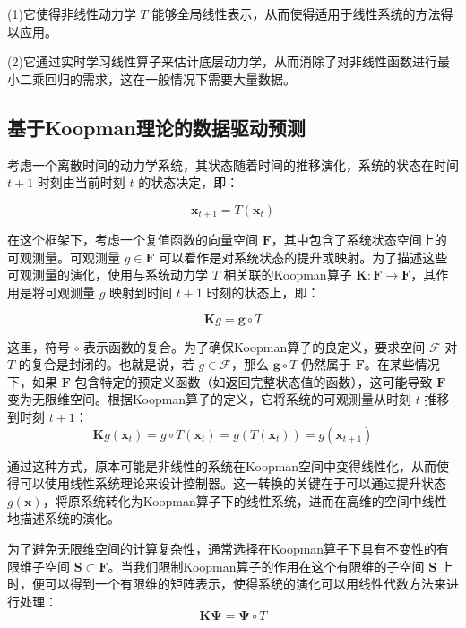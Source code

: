 \documentclass[lang=chs, degree=master, blindreview=false, winfonts=true]{yanputhesis}
\begin{document}
(1)它使得非线性动力学 \( T \) 能够全局线性表示，从而使得适用于线性系统的方法得以应用。

(2)它通过实时学习线性算子来估计底层动力学，从而消除了对非线性函数进行最小二乘回归的需求，这在一般情况下需要大量数据。


\subsection{基于Koopman理论的数据驱动预测}

考虑一个离散时间的动力学系统，其状态随着时间的推移演化，系统的状态在时间 \( t+1 \) 时刻由当前时刻 \( t \) 的状态决定，即：

\begin{equation}
    {\bm x}_{t+1} = T({\bm x}_t)
\end{equation}

在这个框架下，考虑一个复值函数的向量空间 \( \mathcal{\bm F} \)，其中包含了系统状态空间上的可观测量。可观测量 \( g \in \mathcal{\bm F} \) 可以看作是对系统状态的提升或映射。为了描述这些可观测量的演化，使用与系统动力学 \( T \) 相关联的Koopman算子 \( \mathcal{\bm K}: \mathcal{\bm F} \to \mathcal{\bm F} \)，其作用是将可观测量 \( g \) 映射到时间 \( t+1 \) 时刻的状态上，即：

\begin{equation}
    \mathcal{\bm K} g = \bm g \circ T
\end{equation}

这里，符号 \( \circ \) 表示函数的复合。为了确保Koopman算子的良定义，要求空间 \( \mathcal{F} \) 对 \( T \) 的复合是封闭的。也就是说，若 \(  g \in \mathcal{F} \)，那么 \( \bm g \circ T \) 仍然属于 \( \mathcal{\bm F} \)。在某些情况下，如果 \( \mathcal{\bm F} \) 包含特定的预定义函数（如返回完整状态值的函数），这可能导致 \( \mathcal{\bm F} \) 变为无限维空间。根据Koopman算子的定义，它将系统的可观测量从时刻 \( t \) 推移到时刻 \( t+1 \)：
\begin{equation}
    \mathcal{\bm K} g(\bm x_t) = g \circ T(\bm x_t) = g(T(\bm x_t)) = g(\bm x_{t+1})
\end{equation}

通过这种方式，原本可能是非线性的系统在Koopman空间中变得线性化，从而使得可以使用线性系统理论来设计控制器。这一转换的关键在于可以通过提升状态 \( g(\bm x) \)，将原系统转化为Koopman算子下的线性系统，进而在高维的空间中线性地描述系统的演化。

为了避免无限维空间的计算复杂性，通常选择在Koopman算子下具有不变性的有限维子空间 \( \mathcal{\bm S} \subset \mathcal{\bm F} \)。当我们限制Koopman算子的作用在这个有限维的子空间 \( \mathcal{\bm S} \) 上时，便可以得到一个有限维的矩阵表示，使得系统的演化可以用线性代数方法来进行处理：
\begin{equation}
    \mathcal{\bm K}\bm \Psi = \bm \Psi \circ T
\end{equation}
\end{document}
